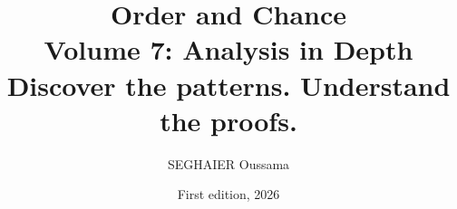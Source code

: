 \documentclass[11pt,openany]{book}
\title{\Huge\textbf{Order and Chance}\\[0.4em]\LARGE Volume 7: Analysis in Depth\\[0.6em]
\Large Discover the patterns. Understand the proofs.}
\author{SEGHAIER Oussama}
\date{First edition, 2026}
\begin{document}
\frontmatter
\makecover
\maketitle

\tableofcontents

\mainmatter












\end{document}
